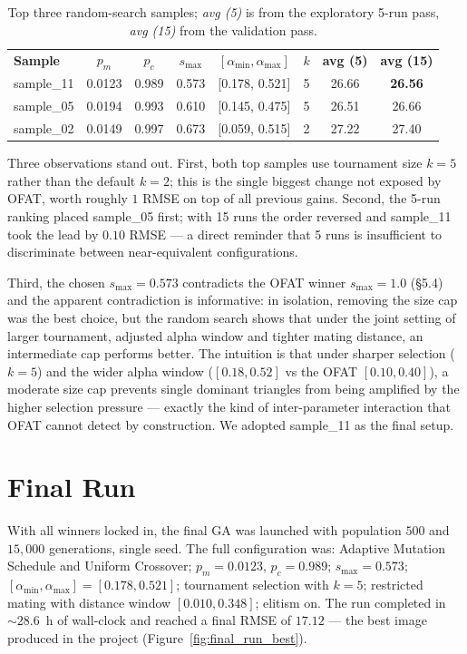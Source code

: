 \documentclass[11pt,a4paper]{article}
\newcommand{\tH}[1]{\textcolor{novagreen}{\textbf{#1}}}
\newcommand{\gmid}{\arrayrulecolor{novagreen}\midrule\arrayrulecolor{black}}
\begin{document}
\begin{table}[h]
\centering
\small
\begin{tabular}{lccccccc}
\toprule
\tH{Sample} & \tH{$p_m$} & \tH{$p_c$} & \tH{$s_{\max}$} & \tH{$[\alpha_{\min},\alpha_{\max}]$} & \tH{$k$} & \tH{avg (5)} & \tH{avg (15)} \\
\gmid
sample\_11 & 0.0123 & 0.989 & 0.573 & [0.178, 0.521] & 5 & 26.66 & \textbf{26.56} \\
sample\_05 & 0.0194 & 0.993 & 0.610 & [0.145, 0.475] & 5 & 26.51 & 26.66 \\
sample\_02 & 0.0149 & 0.997 & 0.673 & [0.059, 0.515] & 2 & 27.22 & 27.40 \\
\bottomrule
\end{tabular}
\caption{Top three random-search samples; \textit{avg (5)} is from the
exploratory 5-run pass, \textit{avg (15)} from the validation pass.}
\end{table}

Three observations stand out. First, both top samples use tournament
size $k=5$ rather than the default $k=2$; this is the single biggest
change not exposed by OFAT, worth roughly $1$ RMSE on top of all
previous gains. Second, the 5-run ranking placed sample\_05 first;
with 15 runs the order reversed and sample\_11 took the lead by
$0.10$ RMSE --- a direct reminder that 5 runs is insufficient to
discriminate between near-equivalent configurations.

Third, the chosen $s_{\max} = 0.573$ contradicts the OFAT winner
$s_{\max} = 1.0$ (\S5.4) and the apparent contradiction is informative:
in isolation, removing the size cap was the best choice, but the random
search shows that under the joint setting of larger tournament,
adjusted alpha window and tighter mating distance, an intermediate
cap performs better. The intuition is that under sharper selection
($k = 5$) and the wider alpha window ($[0.18, 0.52]$ vs the OFAT
$[0.10, 0.40]$), a moderate size cap prevents single dominant
triangles from being amplified by the higher selection pressure ---
exactly the kind of inter-parameter interaction that OFAT cannot
detect by construction. We adopted sample\_11 as the final setup.

\section{Final Run}

With all winners locked in, the final GA was launched with
population $500$ and $15{,}000$ generations, single seed. The full
configuration was: Adaptive Mutation Schedule and Uniform Crossover;
$p_m = 0.0123$, $p_c = 0.989$; $s_{\max} = 0.573$;
$[\alpha_{\min}, \alpha_{\max}] = [0.178, 0.521]$; tournament selection
with $k = 5$; restricted mating with distance window $[0.010, 0.348]$;
elitism on. The run completed in $\sim\!28.6$~h of wall-clock and
reached a final RMSE of $\mathbf{17.12}$ --- the best image produced
in the project (Figure~\ref{fig:final_run_best}).
\end{document}
